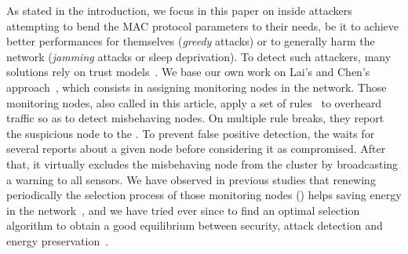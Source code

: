 As stated in the introduction, we focus in this paper on inside attackers attempting to bend the MAC protocol parameters to their needs, be it to achieve better performances for themselves (\emph{greedy} attacks) or to generally harm the network (\emph{jamming} attacks or sleep deprivation).
To detect such attackers, many solutions rely on trust models~\cite{MC10}.
We base our own work on Lai's and Chen's approach~\cite{LC08}, which consists in assigning monitoring nodes in the network.
Those monitoring nodes, also called \cns in this article, apply a set of rules~\cite{RKKK13} to overheard traffic so as to detect misbehaving nodes.
On multiple rule breaks, they report the suspicious node to the \ch.
To prevent false positive detection, the \CH waits for several reports about a given node before considering it as compromised.
After that, it virtually excludes the misbehaving node from the cluster by broadcasting a warning to all sensors.
We have observed in previous studies that renewing periodically the selection process of those monitoring nodes (\cns) helps saving energy in the network~\cite{BMM13}, and we have tried ever since to find an optimal selection algorithm to obtain a good equilibrium between security, attack detection and energy preservation~\cite{MMB14}.
